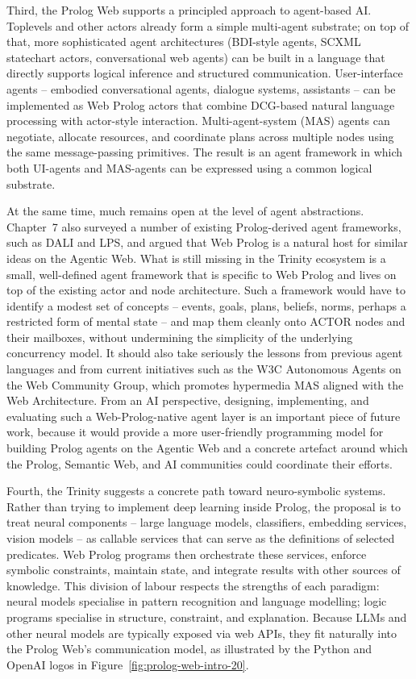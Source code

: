 Third, the Prolog Web supports a principled approach to agent-based AI. Toplevels and other actors already form a simple multi-agent substrate; on top of that, more sophisticated agent architectures (BDI-style agents, SCXML statechart actors, conversational web agents) can be built in a language that directly supports logical inference and structured communication. User-interface agents -- embodied conversational agents, dialogue systems, assistants -- can be implemented as Web Prolog actors that combine DCG-based natural language processing with actor-style interaction. Multi-agent-system (MAS) agents can negotiate, allocate resources, and coordinate plans across multiple nodes using the same message-passing primitives. The result is an agent framework in which both UI-agents and MAS-agents can be expressed using a common logical substrate.

At the same time, much remains open at the level of agent abstractions. Chapter~7 also surveyed a number of existing Prolog-derived agent frameworks, such as DALI and LPS, and argued that Web Prolog is a natural host for similar ideas on the Agentic Web. What is still missing in the Trinity ecosystem is a small, well-defined agent framework that is specific to Web Prolog and lives on top of the existing actor and node architecture. Such a framework would have to identify a modest set of concepts -- events, goals, plans, beliefs, norms, perhaps a restricted form of mental state -- and map them cleanly onto ACTOR nodes and their mailboxes, without undermining the simplicity of the underlying concurrency model. It should also take seriously the lessons from previous agent languages and from current initiatives such as the W3C Autonomous Agents on the Web Community Group, which promotes hypermedia MAS aligned with the Web Architecture. From an AI perspective, designing, implementing, and evaluating such a Web-Prolog-native agent layer is an important piece of future work, because it would provide a more user-friendly programming model for building Prolog agents on the Agentic Web and a concrete artefact around which the Prolog, Semantic Web, and AI communities could coordinate their efforts.

Fourth, the Trinity suggests a concrete path toward neuro-symbolic systems. Rather than trying to implement deep learning inside Prolog, the proposal is to treat neural components -- large language models, classifiers, embedding services, vision models -- as callable services that can serve as the definitions of selected predicates. Web Prolog programs then orchestrate these services, enforce symbolic constraints, maintain state, and integrate results with other sources of knowledge. This division of labour respects the strengths of each paradigm: neural models specialise in pattern recognition and language modelling; logic programs specialise in structure, constraint, and explanation. Because LLMs and other neural models are typically exposed via web APIs, they fit naturally into the Prolog Web's communication model, as illustrated by the Python and OpenAI logos in Figure~\ref{fig:prolog-web-intro-20}.

